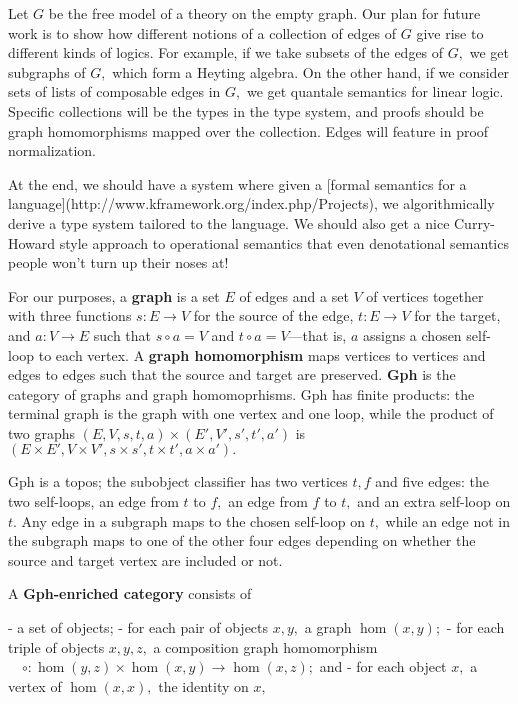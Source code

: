 \documentclass[a4paper,UKenglish]{article}
\begin{document}
Let $G$ be the free model of a theory on the empty graph.  Our plan for future work is to show how different notions of a collection of edges of $G$ give rise to different kinds of logics.  For example, if we take subsets of the edges of $G,$ we get subgraphs of $G,$ which form a Heyting algebra.  On the other hand, if we consider sets of lists of composable edges in $G,$ we get quantale semantics for linear logic.  Specific collections will be the types in the type system, and proofs should be graph homomorphisms mapped over the collection. Edges will feature in proof normalization.

At the end, we should have a system where given a [formal semantics for a language](http://www.kframework.org/index.php/Projects), we algorithmically derive a type system tailored to the language.  We should also get a nice Curry-Howard style approach to operational semantics that even denotational semantics people won't turn up their noses at!



For our purposes, a {\bf graph} is a set $E$ of edges and a set $V$ of vertices together with three functions $s\colon E \to V$ for the source of the edge, $t\colon E \to V$ for the target, and $a\colon V \to E$ such that $s\circ a = V$ and $t \circ a = V$---that is, $a$
assigns a chosen self-loop to each vertex.  A {\bf graph homomorphism} maps vertices to vertices and edges to edges such that the source and target are preserved.  {\bf Gph} is the category of graphs and graph homomoprhisms.  Gph has finite products: the terminal graph is the graph with one vertex and one loop, while the product of two graphs $(E , V , s, t, a) \times (E' , V' , s' , t' , a')$ is $(E \times E',
V \times V', s \times s', t\times t', a \times a').$

Gph is a topos; the subobject classifier has two vertices $t, f$ and five edges: the two self-loops, an edge from $t$ to $f,$ an edge from $f$ to $t,$ and an extra self-loop on $t$.  Any edge in a subgraph
maps to the chosen self-loop on $t,$ while an edge not in the subgraph maps to one of the other four edges depending on whether the source and target vertex are included or not.

A {\bf Gph-enriched category} consists of

- a set of objects;
- for each pair of objects $x, y,$ a graph $\hom(x,y);$
- for each triple of objects $x, y, z,$ a composition graph homomorphism
  $\quad \circ\colon \hom(y, z) \times \hom(x, y) \to \hom(x, z);$ and
- for each object $x,$ a vertex of $\hom(x, x),$ the identity on $x,$
\end{document}
